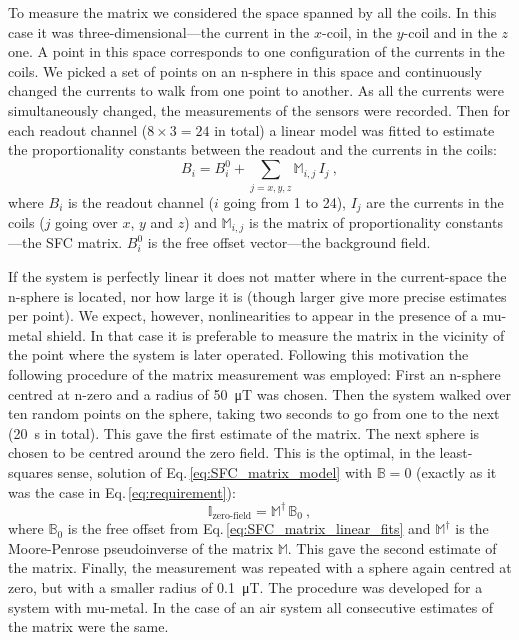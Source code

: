 To measure the matrix we considered the space spanned by all the coils. In this case it was three-dimensional---the current in the $x$-coil, in the $y$-coil and in the $z$ one. A point in this space corresponds to one configuration of the currents in the coils. We picked a set of points on an n-sphere in this space and continuously changed the currents to walk from one point to another. As all the currents were simultaneously changed, the measurements of the sensors were recorded. Then for each readout channel ($8 \times 3 = 24$ in total) a linear model was fitted to estimate the proportionality constants between the readout and the currents in the coils:
\begin{equation}
  \label{eq:SFC_matrix_linear_fits}
  B_i = B_i^0 + \sum_{j=x,y,z} \mathbb{M}_{i,j} \, I_j \ ,
\end{equation}
where $B_i$ is the readout channel ($i$ going from 1 to 24), $I_j$ are the currents in the coils ($j$ going over $x$, $y$ and $z$) and $\mathbb{M}_{i,j}$ is the matrix of proportionality constants---the SFC matrix. $B_i^0$ is the free offset vector---the background field.

If the system is perfectly linear it does not matter where in the current-space the n-sphere is located, nor how large it is (though larger give more precise estimates per point). We expect, however, nonlinearities to appear in the presence of a mu-metal shield.
In that case it is preferable to measure the matrix in the vicinity of the point where the system is later operated. Following this motivation the following procedure of the matrix measurement was employed: First an n-sphere centred at n-zero and a radius of \SI{50}{\micro\tesla} was chosen. Then the system walked over ten random points on the sphere, taking two seconds to go from one to the next (\SI{20}{\second} in total).
This gave the first estimate of the matrix. The next sphere is chosen to be centred around the zero field. This is the optimal, in the least-squares sense, solution of Eq.\,\ref{eq:SFC_matrix_model} with $\mathbb{B} = 0$ (exactly as it was the case in Eq.\,\ref{eq:requirement}):
\begin{equation}
  \label{eq:SFC_zero_field_requirement}
  \mathbb{I}_\text{zero-field} = \mathbb{M}^\dagger \, \mathbb{B}_0 \ ,
\end{equation}
where $\mathbb{B}_0$ is the free offset from Eq.\,\ref{eq:SFC_matrix_linear_fits} and $\mathbb{M}^\dagger$ is the Moore-Penrose pseudoinverse of the matrix $\mathbb{M}$. This gave the second estimate of the matrix. Finally, the measurement was repeated with a sphere again centred at zero, but with a smaller radius of \SI{0.1}{\micro\tesla}. The procedure was developed for a system with mu-metal.  In the case of an air system all consecutive estimates of the matrix were the same.

